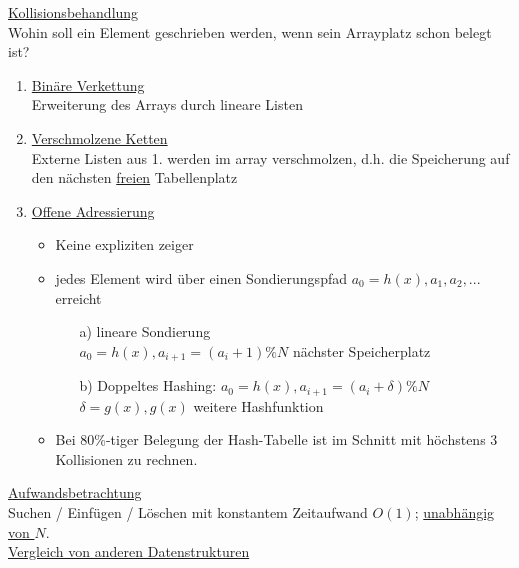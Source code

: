 \underline{Kollisionsbehandlung} \\
Wohin soll ein Element geschrieben werden, wenn sein Arrayplatz schon belegt ist?
\begin{enumerate}
    \item \underline{Binäre Verkettung} \\
    Erweiterung des Arrays durch lineare Listen 
    \item \underline{Verschmolzene Ketten} \\
    Externe Listen aus 1. werden im array \glq verschmolzen\grq, d.h. die Speicherung auf den nächsten \underline{freien} Tabellenplatz
    \item \underline{Offene Adressierung}
    \begin{itemize}
        \item Keine expliziten zeiger
        \item jedes Element wird über einen Sondierungspfad $a_0 = h(x), a_1, a_2, ...$ erreicht
        \begin{itemize}
            \item[a)] lineare Sondierung \\
            $a_0 = h(x), a_{i+1} = (a_i + 1) \% N$ nächster Speicherplatz
            \item[b)] Doppeltes Hashing:
            $a_0 = h(x), a_{i + 1} = (a_i + \delta ) \% N$ \\
            $\delta = g(x), g(x)$ weitere Hashfunktion
        \end{itemize}
        \item Bei 80\%-tiger Belegung der Hash-Tabelle ist im Schnitt mit höchstens 3 Kollisionen zu rechnen.
    \end{itemize}
\end{enumerate}
\underline{Aufwandsbetrachtung} \\
Suchen / Einfügen / Löschen mit konstantem Zeitaufwand $O(1)$; \underline{unabhängig von $N$}. \\
\underline{Vergleich von anderen Datenstrukturen}

